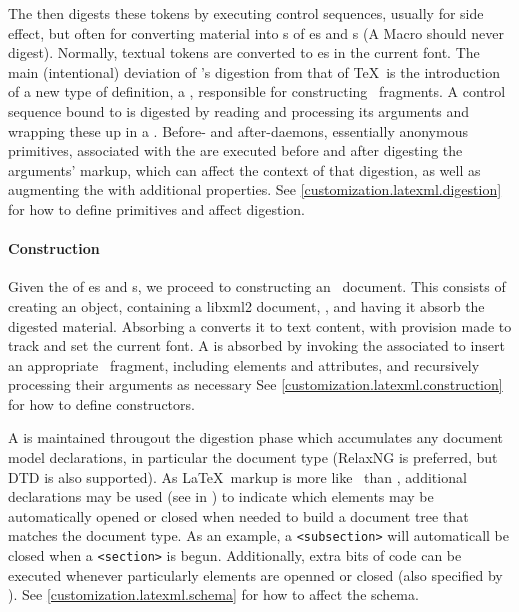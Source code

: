 \documentclass{book}
\newcommand{\xmlcode}{\lstinline[style=xml]}
\begin{document}
The  then digests these tokens by executing  control 
sequences, usually for side effect, but often for converting material
into s of es and s
(A Macro should never digest).
Normally, textual tokens are converted to es in the current font.
The main (intentional) deviation of \LaTeXML's digestion from that of \TeX\ is
the introduction of a new type of definition, a ,
responsible for constructing \XML\ fragments.
A control sequence bound to  is digested by
reading and processing its arguments and wrapping these up in a .
Before- and after-daemons, essentially anonymous primitives, associated with
the  are executed before and after digesting the 
arguments' markup, which can affect the context of that digestion, as well
as augmenting the  with additional properties.
See \ref{customization.latexml.digestion} for how to define primitives
and affect digestion.


\paragraph{Construction}\label{architecture.latexml.construction}
%
%
%
Given the  of es and s,
we proceed to constructing an \XML\ document.
This consists of creating an  object, containing
a libxml2 document, , and having it absorb the digested
material. Absorbing a  converts it to text content, with provision
made to track and set the current font.
A  is absorbed by invoking the associated 
to insert an appropriate \XML\ fragment, including elements and attributes,
and recursively processing their arguments as necessary
See \ref{customization.latexml.construction} for how to define
constructors.

A  is maintained througout the digestion phase which accumulates
any document model declarations, in particular the document type (RelaxNG is
preferred, but DTD is also supported).  As \LaTeX\ markup is more
like \SGML\ than \XML, additional declarations may be used (see  in )
to indicate which elements may
be automatically opened or closed when needed to build a document tree that matches
the document type.  As an example, a \xmlcode{<subsection>} will automaticall be closed
when a \xmlcode{<section>} is begun.  Additionally, extra bits of code can
be executed whenever particularly elements are openned or closed (also
specified by ).
See \ref{customization.latexml.schema} for how to affect the schema.
\end{document}

